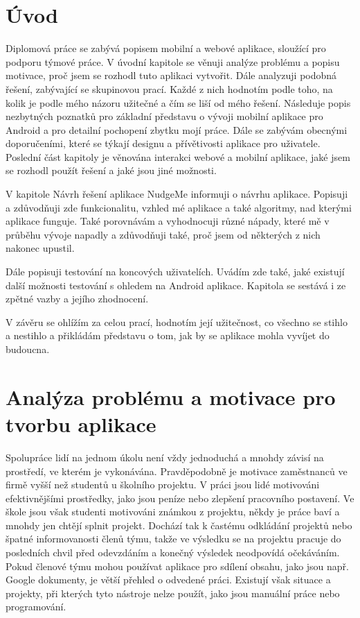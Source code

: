 
\chapter{Úvod}
Diplomová práce se zabývá popisem mobilní a webové aplikace, sloužící pro podporu týmové práce. V úvodní kapitole se věnuji analýze problému a popisu motivace, proč jsem se rozhodl tuto aplikaci vytvořit. Dále analyzuji podobná řešení, zabývající se skupinovou prací. Každé z nich hodnotím podle toho, na kolik je podle mého názoru užitečné a čím se liší od mého řešení. Následuje popis nezbytných poznatků pro základní představu o vývoji mobilní aplikace pro Android a pro detailní pochopení zbytku mojí práce. Dále se zabývám obecnými doporučeními, které se týkají designu a přívětivosti aplikace pro uživatele. Poslední část kapitoly je věnována interakci webové a mobilní aplikace, jaké jsem se rozhodl použít řešení a jaké jsou jiné možnosti.

V kapitole Návrh řešení aplikace NudgeMe informuji o návrhu aplikace. Popisuji a zdůvodňuji zde funkcionalitu, vzhled mé aplikace a také algoritmy, nad kterými aplikace funguje. Také porovnávám a vyhodnocuji různé nápady, které mě v průběhu vývoje napadly a zdůvodňuji také, proč jsem od některých z nich nakonec upustil. 

Dále popisuji testování na koncových uživatelích. Uvádím zde také, jaké existují další možnosti testování s ohledem na Android aplikace. Kapitola se sestává i ze zpětné vazby a jejího zhodnocení. 

V závěru se ohlížím za celou prací, hodnotím její užitečnost, co všechno se stihlo a nestihlo a přikládám představu o tom, jak by se aplikace mohla vyvíjet do budoucna.

\chapter{Analýza problému a motivace pro tvorbu aplikace}

Spolupráce lidí na jednom úkolu není vždy jednoduchá a mnohdy závisí na prostředí, ve kterém je vykonávána. Pravděpodobně je motivace zaměstnanců ve firmě vyšší než studentů u školního projektu. V práci jsou lidé motivováni efektivnějšími prostředky, jako jsou peníze nebo zlepšení pracovního postavení. Ve škole jsou však studenti motivováni známkou z projektu, někdy je práce baví a mnohdy jen chtějí splnit projekt. Dochází tak k častému odkládání projektů nebo špatné informovanosti členů týmu, takže ve výsledku se na projektu pracuje do posledních chvil před odevzdáním a konečný výsledek neodpovídá očekáváním. Pokud členové týmu mohou používat aplikace pro sdílení obsahu, jako jsou např. Google dokumenty, je větší přehled o odvedené práci. Existují však situace a projekty, při kterých tyto nástroje nelze použít, jako jsou manuální práce nebo programování. 

